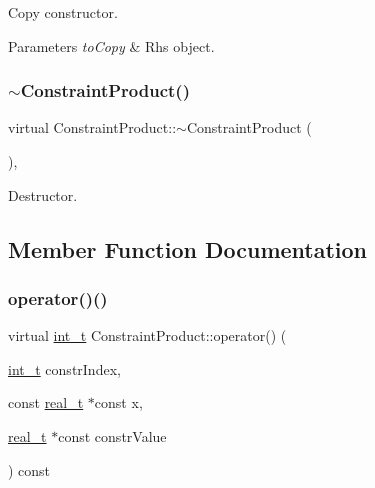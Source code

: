 Copy constructor. 
\begin{DoxyParams}{Parameters}
{\em to\+Copy} & Rhs object. \\
\hline
\end{DoxyParams}
\mbox{\label{class_constraint_product_aed57ccadc2d93bc14ead078e22912df3}} 
\subsubsection{\texorpdfstring{$\sim$\+Constraint\+Product()}{~ConstraintProduct()}}
{\footnotesize\ttfamily virtual Constraint\+Product\+::$\sim$\+Constraint\+Product (\begin{DoxyParamCaption}{ }\end{DoxyParamCaption})\hspace{0.3cm}{\ttfamily [inline]}, {\ttfamily [virtual]}}

Destructor. 

\subsection{Member Function Documentation}
\mbox{\label{class_constraint_product_a597e1001d283a43844b4bb8d45d6b9bd}} 
\subsubsection{\texorpdfstring{operator()()}{operator()()}}
{\footnotesize\ttfamily virtual \hyperlink{_types_8hpp_ab6fd6105e64ed14a0c9281326f05e623}{int\+\_\+t} Constraint\+Product\+::operator() (\begin{DoxyParamCaption}\item[{\hyperlink{_types_8hpp_ab6fd6105e64ed14a0c9281326f05e623}{int\+\_\+t}}]{constr\+Index,  }\item[{const \hyperlink{qp_o_a_s_e_s__wrapper_8h_a0d00e2b3dfadee81331bbb39068570c4}{real\+\_\+t} $\ast$const}]{x,  }\item[{\hyperlink{qp_o_a_s_e_s__wrapper_8h_a0d00e2b3dfadee81331bbb39068570c4}{real\+\_\+t} $\ast$const}]{constr\+Value }\end{DoxyParamCaption}) const\hspace{0.3cm}{\ttfamily [pure virtual]}}

